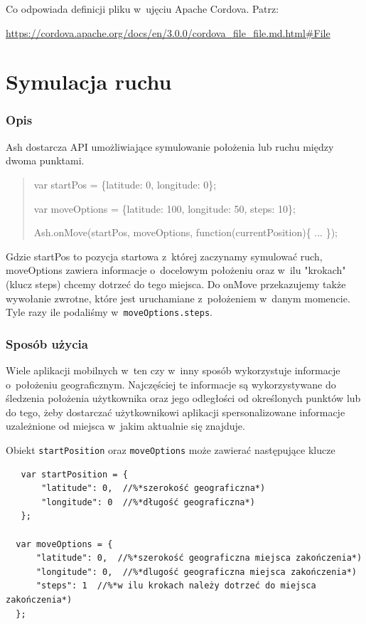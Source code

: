 \documentclass[brudnopis]{xmgr}
\begin{document}
Co odpowiada definicji pliku w~ujęciu Apache Cordova. Patrz:

\url{https://cordova.apache.org/docs/en/3.0.0/cordova_file_file.md.html#File}

\section{Symulacja ruchu}

\subsubsection{Opis}
Ash dostarcza API umożliwiające symulowanie położenia lub ruchu między dwoma punktami.

\begin{quote}
var startPos = \{latitude: 0, longitude: 0\};

var moveOptions = \{latitude: 100, longitude: 50, steps: 10\};

Ash.onMove(startPos, moveOptions, function(currentPosition)\{ ... \});
\end{quote}

Gdzie startPos to pozycja startowa z~której zaczynamy symulować ruch, moveOptions zawiera informacje o~docelowym położeniu oraz w~ilu "krokach" (klucz steps) chcemy dotrzeć do tego miejsca. Do onMove przekazujemy także wywołanie zwrotne, które jest uruchamiane z~położeniem w~danym momencie. Tyle razy ile podaliśmy w~\texttt{moveOptions.steps}. 

\subsubsection{Sposób użycia}

Wiele aplikacji mobilnych w~ten czy w~inny sposób wykorzystuje informacje o~położeniu geograficznym. Najczęściej te informacje są wykorzystywane do śledzenia położenia użytkownika oraz jego odległości od określonych punktów lub do tego, żeby dostarczać użytkownikowi aplikacji spersonalizowane informacje uzależnione od miejsca w~jakim aktualnie się znajduje. 

Obiekt \texttt{startPosition} oraz \texttt{moveOptions} może zawierać następujące klucze

\begin{lstlisting}
   var startPosition = {
       "latitude": 0,  //%*szerokość geograficzna*)
       "longitude": 0  //%*długość geograficzna*)
   };
 
  var moveOptions = {
      "latitude": 0,  //%*szerokość geograficzna miejsca zakończenia*)
      "longitude": 0,  //%*dlugość geograficzna miejsca zakończenia*)
      "steps": 1  //%*w ilu krokach należy dotrzeć do miejsca zakończenia*)
  };
\end{lstlisting}
\end{document}
